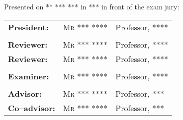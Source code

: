 \begin{titlepage}
\begin{center}
        Presented on ** *** *** in *** in front of the exam jury:\\
    \end{center}
    \begin{center}
        \begin{tabular}{lll}
            \textbf{President:}   & \textsc{Mr *** ****} & Professor, \textsc{****}
            \tabularnewline
            \tabularnewline
            \textbf{Reviewer:}    & \textsc{Mr *** ****} & Professor, \textsc{****}
            \tabularnewline
            \textbf{Reviewer:}    & \textsc{Mr *** ****} & Professor, \textsc{****}
            \tabularnewline
            \tabularnewline
            \textbf{Examiner:}    & \textsc{Mr *** ****} & Professor, \textsc{****}
            \tabularnewline
            \tabularnewline
            \textbf{Advisor:}     & \textsc{Mr *** ****} & Professor, \textsc{***}
            \tabularnewline
            \textbf{Co--advisor:} & \textsc{Mr *** ****} & Professor, \textsc{***}
        \end{tabular}
    \end{center}
    \sloppy
\end{titlepage}
